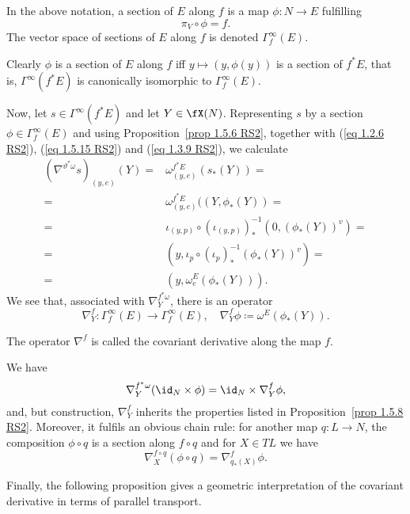 \begin{defn}
    In the above notation, a section of $E$ along $f$ is a map $\phi:N\to E$ fulfilling 
    \[\pi_V\circ \phi=f.\]
    The vector space of sections of $E$ along $f$ is denoted $\Gamma_f^\infty(E)$.
\end{defn}

Clearly $\phi$ is a section of $E$ along $f$ iff $y\mapsto (y,\phi(y))$ is a section of $f^\ast E$, that is, $\Gamma^\infty(f^\ast E)$ is canonically isomorphic to $\Gamma^\infty_f(E)$.

Now, let $s\in\Gamma^\infty(f^\ast E)$ and let $Y\in\fX(N)$. Representing $s$ by a section $\phi\in \Gamma^\infty_f(E)$ and using Proposition~\ref{prop 1.5.6 RS2}, together with (\ref{eq 1.2.6 RS2}), (\ref{eq 1.5.15 RS2}) and (\ref{eq 1.3.9 RS2}), we calculate
\begin{align}
    (\nabla^{\vartheta^\ast\omega}s)_{(y,e)}(Y)=&\omega^{f^\ast E}_{(y,e)}(s_\ast(Y))=\\
    =&\omega^{f^\ast E}_{(y,e)}((Y,\phi_\ast(Y))=\\
    =&\iota_{(y,p)}\circ (\iota_{(y,p)})_\ast^{-1}(0,(\phi_\ast(Y))^v)=\\
    =&(y,\iota_p\circ (\iota_p)_\ast^{-1}(\phi_\ast(Y))^v)=\\
    =&(y,\omega^E_e(\phi_\ast(Y))).
\end{align}
We see that, associated with $\nabla^{f^\ast\omega}_Y$, there is an operator
\[\nabla^f_Y:\Gamma^\infty_f(E)\to \Gamma^\infty_f(E),\quad \nabla^f_Y \phi\coloneqq \omega^E(\phi_\ast(Y)).\label{eq 1.5.16 RS2}\]

\begin{defn}
    The operator $\nabla^f$ is called the covariant derivative along the map $f$.
\end{defn}

We have
\[\nabla_Y^{f^\ast\omega}(\id_N\times \phi)=\id_N\times \nabla^f_Y \phi,\]
and, but construction, $\nabla^f_Y$ inherits the properties listed in Proposition~\ref{prop 1.5.8 RS2}. Moreover, it fulfils an obvious chain rule: for another map $q:L\to N$, the composition $\phi\circ q$ is a section along $f\circ q$ and for $X\in TL$ we have
\[\nabla_X^{f\circ q}(\phi\circ q)=\nabla^f_{q_\ast(X)}\phi.\]


Finally, the following proposition gives a geometric interpretation of the covariant derivative in terms of parallel transport.
  

